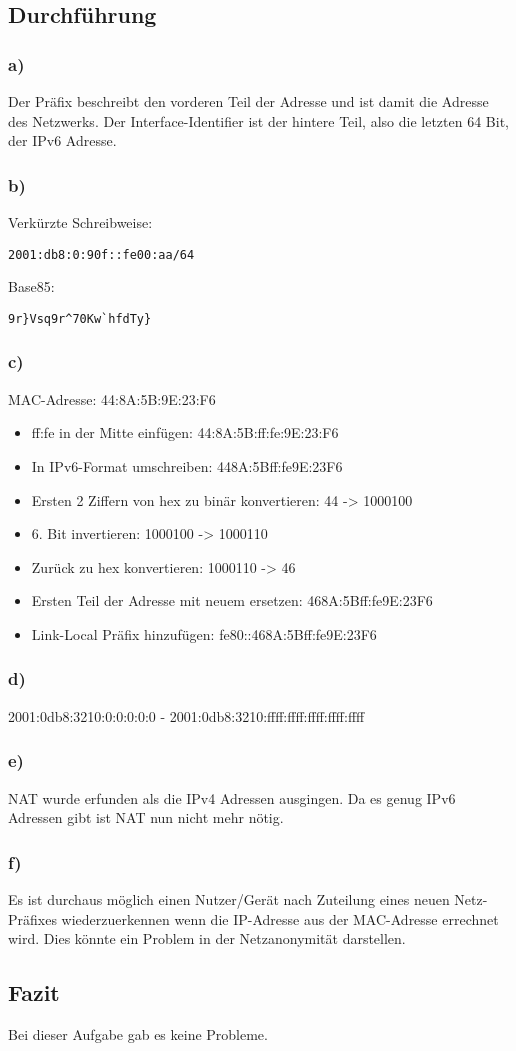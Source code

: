 \subsection{Durchführung}
\subsubsection{a)}
Der Präfix beschreibt den vorderen Teil der Adresse und ist damit die Adresse des Netzwerks. Der Interface-Identifier ist der hintere Teil, also die letzten 64 Bit, der IPv6 Adresse.

\subsubsection{b)}
Verkürzte Schreibweise: 
\begin{lstlisting}
2001:db8:0:90f::fe00:aa/64
\end{lstlisting}

Base85:
\begin{lstlisting}
9r}Vsq9r^70Kw`hfdTy}
\end{lstlisting}

\subsubsection{c)}MAC-Adresse: 44:8A:5B:9E:23:F6
\begin{itemize}
\item ff:fe in der Mitte einfügen: 44:8A:5B:ff:fe:9E:23:F6
\item In IPv6-Format umschreiben: 448A:5Bff:fe9E:23F6
\item Ersten 2 Ziffern von hex zu binär konvertieren: 44 -> 1000100
\item 6. Bit invertieren: 1000100 -> 1000110
\item Zurück zu hex konvertieren: 1000110 -> 46
\item Ersten Teil der Adresse mit neuem ersetzen: 468A:5Bff:fe9E:23F6
\item Link-Local Präfix hinzufügen: fe80::468A:5Bff:fe9E:23F6
\end{itemize}

\subsubsection{d)}
2001:0db8:3210:0:0:0:0:0 - 2001:0db8:3210:ffff:ffff:ffff:ffff:ffff

\subsubsection{e)}
NAT wurde erfunden als die IPv4 Adressen ausgingen. Da es genug IPv6 Adressen gibt ist NAT nun nicht mehr nötig.

\subsubsection{f)}Es ist durchaus möglich einen Nutzer/Gerät nach Zuteilung eines neuen Netz-Präfixes wiederzuerkennen wenn die IP-Adresse aus der MAC-Adresse errechnet wird. Dies könnte ein Problem in der Netzanonymität darstellen.

\subsection{Fazit}
Bei dieser Aufgabe gab es keine Probleme.
